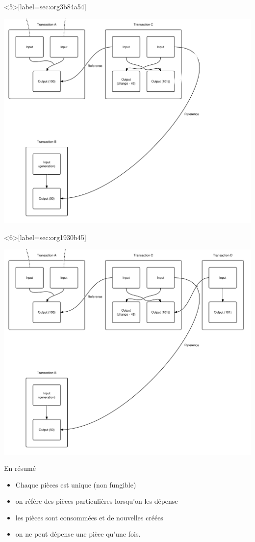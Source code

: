 \documentclass[presentation]{beamer}
\begin{document}
\begin{frame}<5>[label={sec:org3b84a54}]{}
\begin{center}
\includegraphics[width=.9\textwidth]{Images/Transaction5.png}
\end{center}
\end{frame}
\begin{frame}<6>[label={sec:org1930b45}]{}
\begin{center}
\includegraphics[width=.9\textwidth]{Images/Transaction6.png}
\end{center}
\end{frame}



\begin{frame}[label={sec:orgba15f31}]{En résumé}
\begin{itemize}
\item Chaque pièces est unique (non fungible)
\item on réfère des pièces particulières lorsqu'on les dépense
\item les pièces sont consommées et de nouvelles créées
\item on ne peut dépense une pièce qu'une fois.
\end{itemize}
\end{frame}
\end{document}
